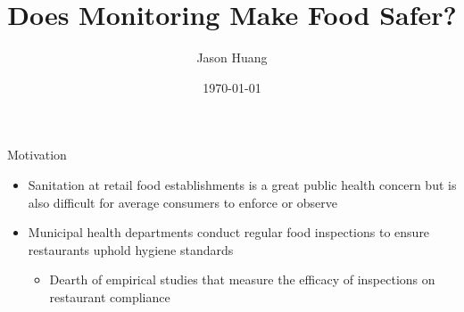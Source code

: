 \documentclass[handout]{beamer}
\title[Health Inspection]{Does Monitoring Make Food Safer?}
\subtitle{}
\author{Jason Huang}
\date{\today}
\begin{document}
\newcommand{\cfbox}[2]{%
    \colorlet{currentcolor}{.}%
    {\color{#1}%
    \fbox{\color{currentcolor}#2}}%
}
\begin{frame}
  \titlepage
\end{frame}




\begin{frame}{Motivation}
\begin{itemize}
    \item Sanitation at retail food establishments is a great public health concern but is also difficult for average consumers to enforce or observe
    \pause
    \item Municipal health departments conduct regular food inspections to ensure restaurants uphold hygiene standards
    \begin{itemize}
    \item Dearth of empirical studies that measure the efficacy of inspections on restaurant compliance
    \end{itemize}
    \end{itemize}
    

\end{frame}
\end{document}
